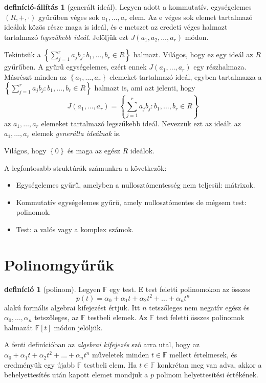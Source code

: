 \documentclass[9pt, a4paper, showtrims]{memoir}
\theoremstyle{plain}
\theoremstyle{remark}
\theoremstyle{definition}
\newtheorem{definition}[proposition]{definíció}
\newtheorem{defprop}[proposition]{definíció-állítás}
\begin{document}
\begin{defprop}[generált ideál]
	Legyen adott a  kommutatív, egységelemes $\left( R,+,\cdot \right)$ gyűrűben véges sok $a_1,\ldots,a_r$ elem.
	Az e véges sok elemet tartalmazó ideálok közös része maga is ideál,
	és e metszet az eredeti véges halmazt
	tartalmazó \emph{legszűkebb ideál}.
	Jelöljük ezt $J\left( a_1,a_2,\ldots,a_r \right)$ módon.

	Tekintsük a
	$
		\left\{ \sum_{j=1}^ra_jb_j:b_1,\ldots,b_r\in R \right\}
	$
	halmazt.
	Világos,
	hogy ez egy ideál az $R$ gyűrűben.
	A gyűrű egységelemes,
	ezért ennek $J\left( a_1,\ldots,a_r \right)$ egy részhalmaza.
	Másrészt minden az $\left\{ a_1,\ldots,a_r \right\}$ elemeket tartalmazó ideál,
	egyben tartalmazza a
	$
		\left\{ \sum_{j=1}^ra_jb_j:b_1,\ldots,b_r\in R \right\}
	$
	halmazt is,
	ami azt jelenti, hogy
	\[
		J\left( a_1,\ldots,a_r \right)=
		\left\{ \sum_{j=1}^ra_jb_j:b_1,\ldots,b_r\in R \right\}
	\]
	az $a_1,\ldots,a_r$ elemeket tartalmazó legszűkebb ideál.
	Nevezzük ezt az ideált az $a_1,\ldots,a_r$ elemek \emph{generálta ideálnak} is.
\end{defprop}



Világos, hogy $\left\{ 0 \right\}$ és maga az egész $R$ ideálok.

A legfontosabb struktúrák számunkra a következők:
\begin{itemize}
	\item
	      Egységelemes gyűrű, amelyben a nullosztómentesség nem teljesül: mátrixok.
	\item
	      Kommutatív egységelemes gyűrű, amely nullosztómentes de mégsem test: polinomok.
	\item
	      Test:
	      a valós vagy a komplex számok.
\end{itemize}
\section{Polinomgyűrűk}
\begin{definition}[polinom]
	Legyen $\mathbb{F}$ egy test.
	E test feletti polinomokon az összes
	\[
		p\left( t \right)=
		\alpha_0+\alpha_1t+\alpha_2t^2+\ldots+\alpha_nt^n
	\]
	alakú formális algebrai kifejezést értjük.
	Itt $n$ tetszőleges nem negatív egész
	és $\alpha_0,\ldots,\alpha_n$ tetszőleges, az $\mathbb{F}$ testbeli elemek.
	Az $\mathbb{F}$ test feletti összes polinomok halmazát $\mathbb{F}\left[ t \right]$ módon jelöljük.
\end{definition}
A fenti definícióban az \emph{algebrai kifejezés} szó arra utal,  hogy az
\begin{math}
	\alpha_0+\alpha_1t+\alpha_2t^2+\ldots+\alpha_nt^n
\end{math}
műveletek minden $t\in\mathbb{F}$ mellett értelmesek,
és eredményük egy újabb $\mathbb{F}$ testbeli elem.
Ha $t\in\mathbb{F}$ konkrétan meg van adva,
akkor a behelyettesítés után kapott elemet mondjuk a $p$ polinom helyettesítési értékének.
\end{document}
